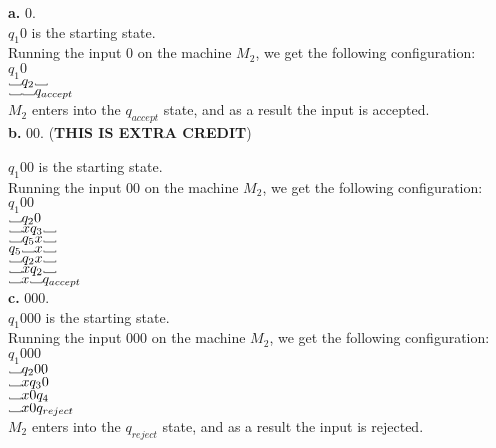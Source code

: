 \documentclass[12pt]{article}
\newcommand\Vtextvisiblespace[1][.8em]{%
	\mbox{\kern.07em\vrule height.3ex}%
	\vbox{\hrule width#1}%
	\hbox{\vrule height.3ex}}
\begin{document}
\textbf{a.} 0. \\

$q_1 0$ is the starting state. \\
Running the input 0 on the machine $M_2$, we get the following configuration: \\

$q_1 0$ \\
$\Vtextvisiblespace q_2 \Vtextvisiblespace$ \\
$\Vtextvisiblespace  \Vtextvisiblespace q_{accept}$  \\
$M_2$ enters into the $q_{accept}$ state, and as a result the input is accepted. \\

\textbf{b.} 00. (\textbf{THIS IS EXTRA CREDIT})

$q_1 00$ is the starting state. \\
Running the input 00 on the machine $M_2$, we get the following configuration: \\

$                            q_1 00$ \\
$ \Vtextvisiblespace         q_2  0$ \\
$ \Vtextvisiblespace x       q_3  \Vtextvisiblespace $ \\
$ \Vtextvisiblespace         q_5  x  \Vtextvisiblespace$ \\
$                            q_5 \Vtextvisiblespace x  \Vtextvisiblespace$ \\
$ \Vtextvisiblespace         q_2  x  \Vtextvisiblespace$ \\
$ \Vtextvisiblespace x       q_2 \Vtextvisiblespace $ \\
$ \Vtextvisiblespace x  \Vtextvisiblespace q_{accept} $ \\

\pagebreak
\textbf{c.} 000. \\
$q_1 000$ is the starting state. \\
Running the input 000 on the machine $M_2$, we get the following configuration: \\

$q_1 000$ \\
$\Vtextvisiblespace q_2 00$ \\
$\Vtextvisiblespace x q_3 0$ \\
$\Vtextvisiblespace x0 q_4 $ \\
$\Vtextvisiblespace x0 q_{reject} $ \\
$M_2$ enters into the $q_{reject}$ state, and as a result the input is rejected. \\
\end{document}
